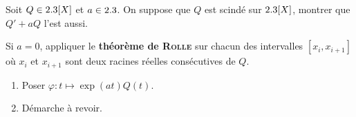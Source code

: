 \begin{exercice}
    Soit $Q \in 2.3[X]$ et $a \in 2.3$. On suppose que $Q$ est scindé sur $2.3[X]$, montrer que $Q'+aQ$ l'est aussi. 
\end{exercice}

\begin{elem_sol}
    Si $a=0$, appliquer le \textbf{théorème de \textsc{Rolle}} sur chacun des intervalles $[x_i, x_{i+1}]$ où $x_i$ et $x_{i+1}$ sont deux racines réelles consécutives de $Q$.
    \begin{enumerate} 
        \item Poser $\varphi:t \mapsto \exp(at)Q(t)$.
        \item Démarche à revoir.
    \end{enumerate}
\end{elem_sol}